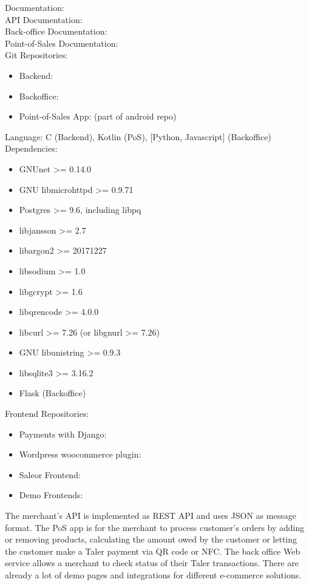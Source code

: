 Documentation: \cite{taler-documentation:merchant-backend-operator-manual} \\
API Documentation: \cite{taler-documentation:merchant-api} \\
Back-office Documentation: \cite{taler-documentation:back-office} \\
Point-of-Sales Documentation: \cite{taler-documentation:pos-manual} \\
Git Repositories: 
\begin{itemize}
\item Backend: \cite{taler-git:merchant}
\item Backoffice: \cite{taler-git:backoffice}
\item Point-of-Sales App: \cite{taler-git:android} (part of android repo)
\end{itemize}
Language: C (Backend), Kotlin (\ac{PoS}), [Python, Javascript] (Backoffice)\\
Dependencies: 
\begin{itemize}
    \item GNUnet            >= 0.14.0
    \item GNU libmicrohttpd >= 0.9.71
    \item Postgres          >= 9.6, including libpq
    \item libjansson        >= 2.7
    \item libargon2         >= 20171227
    \item libsodium         >= 1.0
    \item libgcrypt         >= 1.6
    \item libqrencode       >= 4.0.0
    \item libcurl           >= 7.26 (or libgnurl >= 7.26)
    \item GNU libunistring  >= 0.9.3
    \item libsqlite3        >= 3.16.2
    \item Flask (Backoffice)
\end{itemize}
Frontend Repositories:
\begin{itemize}
    \item Payments with Django: \cite{taler-git:django-payments}
    \item Wordpress woocommerce plugin: \cite{taler-git:woocommerce}
    \item Saleor Frontend: \cite{taler-git:saleor}
    \item Demo Frontends: \cite{taler-git:merchant-demos}
\end{itemize}
The merchant’s API is implemented as REST API and uses \ac{JSON} as message format.
The \ac{PoS} app is for the merchant to process customer's orders by adding or removing products, calculating the amount owed by the customer or letting the customer make a Taler payment via QR code or NFC.
The back office Web service allows a merchant to check status of their Taler transactions.
There are already a lot of demo pages and integrations for different e-commerce solutions.


